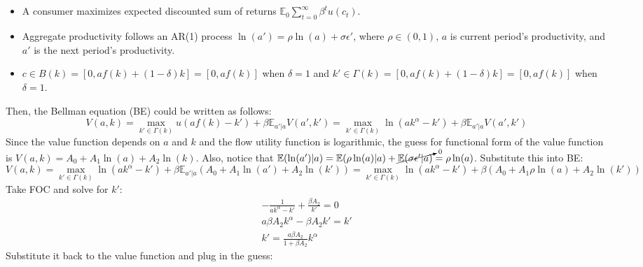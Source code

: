 \documentclass[]{article}
\begin{document}
\subsection{}\label{2.1}
\begin{itemize}
	\item A consumer maximizes expected discounted sum of returns $\mathbb{E}_0\sum\limits_{t = 0}^{\infty}\beta^tu(c_t)$.
	\item Aggregate productivity follows an AR(1) process $\ln(a') = \rho\ln(a) + \sigma\epsilon'$, where $\rho\in(0, 1)$, $a$ is current period's productivity, and $a'$ is the next period's productivity.
	\item $c\in B(k) = [0 , af(k) + (1 - \delta)k] = [0, af(k)]$ when $\delta=1$ and $k'\in\Gamma(k) = [0, af(k) + (1 - \delta)k] = [0, af(k)]$ when $\delta=1$.
\end{itemize}
Then, the Bellman equation (BE) could be written as follows:
\begin{equation}
	V(a, k) = \max\limits_{k'\in\Gamma(k)}u(af(k) -k') + \beta\mathbb{E}_{a'|a}V(a', k') = \max\limits_{k'\in\Gamma(k)}\ln(ak^\alpha -k') + \beta\mathbb{E}_{a'|a}V(a', k')\nonumber
\end{equation}
Since the value function depends on $a$ and $k$ and the flow utility function is logarithmic, the guess for functional form of the value function is $V(a, k) = A_0 + A_1\ln(a) + A_2\ln(k)$. Also, notice that $\mathbb{E}(\ln(a')|a) = \mathbb{E}(\rho\ln(a)|a) + \cancelto{0}{\mathbb{E}(\sigma\epsilon'|a)} = \rho\ln(a)$. Substitute this into BE:
\begin{equation}
V(a, k) = \max\limits_{k'\in\Gamma(k)}\ln(ak^\alpha -k') + \beta\mathbb{E}_{a'|a}(A_0 + A_1\ln(a') + A_2\ln(k')) = \max\limits_{k'\in\Gamma(k)}\ln(ak^\alpha -k') + \beta(A_0 + A_1\rho\ln(a) + A_2\ln(k'))\nonumber
\end{equation}
Take FOC and solve for $k'$:
\begin{equation}
	\begin{split}
	-\frac{1}{ak^\alpha -k'} + \frac{\beta A_2}{k'} = 0 \\ \nonumber
	a\beta A_2k^\alpha - \beta A_2k' = k'\\
	k' = \frac{a\beta A_2}{1 + \beta A_2}k^\alpha
	\end{split}
\end{equation}
Substitute it back to the value function and plug in the guess:
\end{document}
